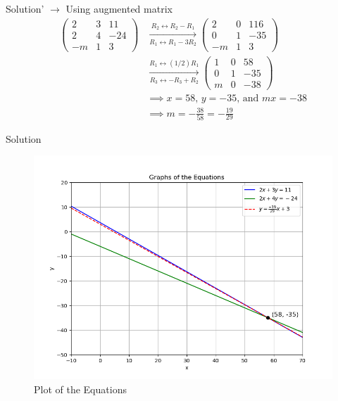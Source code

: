 \documentclass{beamer}
\numberwithin{equation}{section}
\theoremstyle{remark}
\begin{document}
\begin{frame}{Solution}'
$\rightarrow$ Using augmented matrix
\begin{align}
    \left(\begin{array}{cc|c}2&3&11\\2&4&-24\\-m&1&3\end{array}\right)
    &\xrightarrow[R_1 \leftrightarrow R_1 - 3R_2]{R_2 \leftrightarrow R_2 - R_1} \left(\begin{array}{cc|c}2&0&116\\0&1&-35\\-m&1&3\end{array}\right) \\
    &\xrightarrow[R_3 \leftrightarrow -R_3 + R_2]{R_1 \leftrightarrow (1/2)R_1}
    \left(\begin{array}{cc|c}1&0&58\\0&1&-35\\m&0&-38\end{array}\right) \\
    &\implies x = 58\text{, }y = -35\text{, and }mx = -38 \\
    &\implies m = -\frac{38}{58} = -\frac{19}{29}
\end{align}
\end{frame}

\begin{frame}{Solution}
\begin{figure}[h!]
   \centering
   \includegraphics[width=0.85\linewidth]{figs/01.png}
   \caption{Plot of the Equations}
   \label{Plot_1}
\end{figure}
\end{frame}
\end{document}
